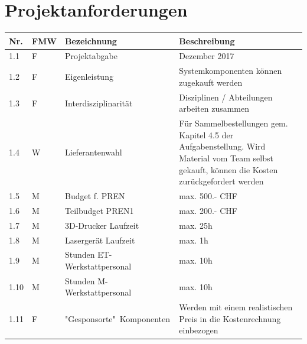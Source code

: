 \documentclass[a4paper]{report}
\begin{document}
\section{Projektanforderungen}
\label{app:sec:ProjektAnf}
\begin{tabular}{|p{}|p{}|p{}|p{}|}
	\hline
	\textbf{Nr.} & \textbf{FMW\footnotemark} & \textbf{Bezeichnung} & \textbf{Beschreibung} \\
	\hline
	1.1 & F & Projektabgabe & Dezember 2017 \\
	\hline
	1.2 & F & Eigenleistung & Systemkomponenten können zugekauft werden \\
	\hline
	1.3 & F & Interdisziplinarität & Disziplinen / Abteilungen arbeiten zusammen \\
	\hline
	1.4 & W & Lieferantenwahl & Für Sammelbestellungen gem. Kapitel 4.5 der Aufgabenstellung. Wird Material vom Team selbst gekauft, können die Kosten zurückgefordert werden \\
	\hline
	1.5 & M & Budget f. PREN & max. 500.- CHF \\
	\hline
	1.6 & M & Teilbudget PREN1 & max. 200.- CHF \\
	\hline
	1.7 & M & 3D-Drucker Laufzeit & max. 25h \\
	\hline
	1.8 & M & Lasergerät Laufzeit & max. 1h \\
	\hline
	1.9 & M & Stunden ET-Werkstattpersonal & max. 10h \\
	\hline
	1.10 & M & Stunden M-Werkstattpersonal & max. 10h \\
	\hline
	1.11 & F & "Gesponsorte"\ Komponenten & Werden mit einem realistischen Preis in die Kostenrechnung einbezogen \\
	\hline
\end{tabular}
\end{document}
